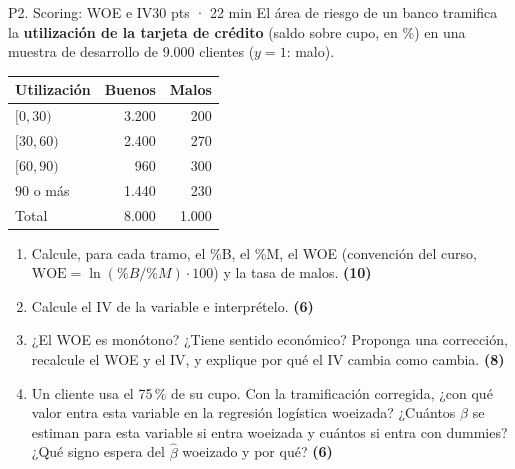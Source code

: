 \documentclass[11pt,a4paper]{article}
\newcommand{\pts}[1]{\hfill\textbf{\small(#1)}}
\begin{document}
\begin{preg}{P2. Scoring: WOE e IV}{30 pts · 22 min}
El área de riesgo de un banco tramifica la \textbf{utilización de la tarjeta de crédito} (saldo sobre cupo, en \%) en una muestra de desarrollo de 9.000 clientes ($y=1$: malo).
\begin{center}\small
\renewcommand{\arraystretch}{1.15}
\begin{tabular}{lrr}\toprule
Utilización & Buenos & Malos\\\midrule
$[0, 30)$ & 3.200 & 200\\
$[30, 60)$ & 2.400 & 270\\
$[60, 90)$ & 960 & 300\\
$90$ o más & 1.440 & 230\\\midrule
Total & 8.000 & 1.000\\\bottomrule
\end{tabular}
\end{center}
\begin{enumerate}[label=\alph*),leftmargin=*,itemsep=2pt]
\item Calcule, para cada tramo, el \%B, el \%M, el WOE (convención del curso, $\text{WOE}=\ln(\%B/\%M)\cdot100$) y la tasa de malos. \pts{10}
\item Calcule el IV de la variable e interprételo. \pts{6}
\item ¿El WOE es monótono? ¿Tiene sentido económico? Proponga una corrección, recalcule el WOE y el IV, y explique por qué el IV cambia como cambia. \pts{8}
\item Un cliente usa el 75\,\% de su cupo. Con la tramificación corregida, ¿con qué valor entra esta variable en la regresión logística woeizada? ¿Cuántos $\beta$ se estiman para esta variable si entra woeizada y cuántos si entra con dummies? ¿Qué signo espera del $\hat\beta$ woeizado y por qué? \pts{6}
\end{enumerate}
\end{preg}
\end{document}
